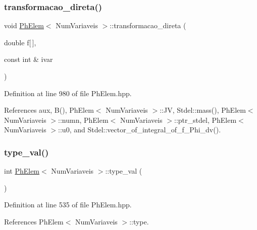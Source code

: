 \subsubsection{\texorpdfstring{transformacao\+\_\+direta()}{transformacao\_direta()}}
{\footnotesize\ttfamily void \hyperlink{classPhElem}{Ph\+Elem}$<$ Num\+Variaveis $>$\+::transformacao\+\_\+direta (\begin{DoxyParamCaption}\item[{double}]{f\mbox{[}$\,$\mbox{]},  }\item[{const int \&}]{ivar }\end{DoxyParamCaption})\hspace{0.3cm}{\ttfamily [inherited]}}



Definition at line 980 of file Ph\+Elem.\+hpp.



References aux, B(), Ph\+Elem$<$ Num\+Variaveis $>$\+::\+JV, Stdel\+::mass(), Ph\+Elem$<$ Num\+Variaveis $>$\+::numn, Ph\+Elem$<$ Num\+Variaveis $>$\+::ptr\+\_\+stdel, Ph\+Elem$<$ Num\+Variaveis $>$\+::u0, and Stdel\+::vector\+\_\+of\+\_\+integral\+\_\+of\+\_\+f\+\_\+\+Phi\+\_\+dv().

\mbox{\label{classPhElem_a4ea6c54e35eb46d331db770f992c4c4b}} 
\subsubsection{\texorpdfstring{type\+\_\+val()}{type\_val()}}
{\footnotesize\ttfamily int \hyperlink{classPhElem}{Ph\+Elem}$<$ Num\+Variaveis $>$\+::type\+\_\+val (\begin{DoxyParamCaption}{ }\end{DoxyParamCaption})\hspace{0.3cm}{\ttfamily [inherited]}}



Definition at line 535 of file Ph\+Elem.\+hpp.



References Ph\+Elem$<$ Num\+Variaveis $>$\+::type.

\mbox{\label{classPhElem_a38499c9f62a291a880d72db646171cb5}} 
